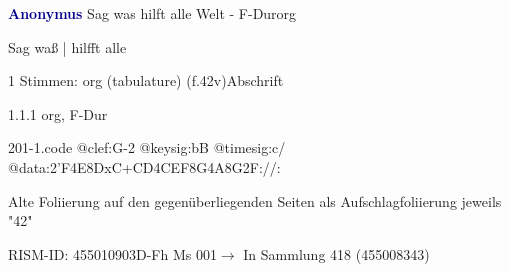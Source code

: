 \documentclass[twocolumn]{book}
\begin{document}
\par \vspace{7pt} \textcolor{darkblue}{\textbf{Anonymus  }}\hfillplus{\textbf{[201]}}\newline Sag was hilft alle Welt - F-Dur\newline org
\par \begin{itshape}[f.42v, at left:] Sag waß | hilfft alle\end{itshape} 
\par \textcolor{darkblue}{}  1 Stimmen: org (tabulature)  (f.42v)\newline Abschrift
\par 1.1.1  org, F-Dur  
\begin{filecontents*}{201-1.code}
@clef:G-2
@keysig:bB
@timesig:c/
@data:2'F4E{8DxC+}{CD}4CEF8G4A8G2F://:
\end{filecontents*}
\newline
%
\par Alte Foliierung auf den gegenüberliegenden Seiten als Aufschlagfoliierung jeweils "42"
\par RISM-ID: 455010903\newline D-Fh  Ms 001\newline $\rightarrow$ In Sammlung 418 (455008343)
      
\end{document}
